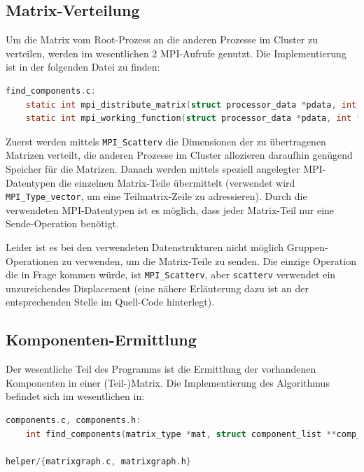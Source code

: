\subsection{Matrix-Verteilung}

Um die Matrix vom Root-Prozess an die anderen Prozesse im Cluster zu verteilen, werden im wesentlichen 2 MPI-Aufrufe genutzt. Die Implementierung ist in der folgenden Datei zu finden:

\begin{lstlisting}[language=C, aboveskip=\baselineskip, basicstyle=\footnotesize\ttfamily, lineskip=0pt]
find_components.c:
	static int mpi_distribute_matrix(struct processor_data *pdata, int *dims, matrix_type *input_matrix)
	static int mpi_working_function(struct processor_data *pdata, int *dims)
\end{lstlisting}

Zuerst werden mittels \verb+MPI_Scatterv+ die Dimensionen der zu übertragenen Matrizen verteilt, die anderen Prozesse im Cluster allozieren daraufhin genügend Speicher für die Matrizen. Danach werden mittels speziell angelegter MPI-Datentypen die einzelnen Matrix-Teile übermittelt (verwendet wird \verb+MPI_Type_vector+, um eine Teilmatrix-Zeile zu adressieren). Durch die verwendeten MPI-Datentypen ist es möglich, dass jeder Matrix-Teil nur eine Sende-Operation benötigt.

Leider ist es bei den verwendeten Datenstrukturen nicht möglich Gruppen-Operationen zu verwenden, um die Matrix-Teile zu senden. Die einzige Operation die in Frage kommen würde, ist \verb+MPI_Scatterv+, aber \verb+scatterv+ verwendet ein unzureichendes Displacement (eine nähere Erläuterung dazu ist an der entsprechenden Stelle im Quell-Code hinterlegt).

\subsection{Komponenten-Ermittlung} \label{algorithm:find_components}

Der wesentliche Teil des Programms ist die Ermittlung der vorhandenen Komponenten in einer (Teil-)Matrix. Die Implementierung des Algorithmus befindet sich im wesentlichen in:

\begin{lstlisting}[language=C, aboveskip=\baselineskip, basicstyle=\footnotesize\ttfamily, lineskip=0pt]
components.c, components.h:
	int find_components(matrix_type *mat, struct component_list **comp_list, vector_type **borders)

helper/{matrixgraph.c, matrixgraph.h}
\end{lstlisting}

